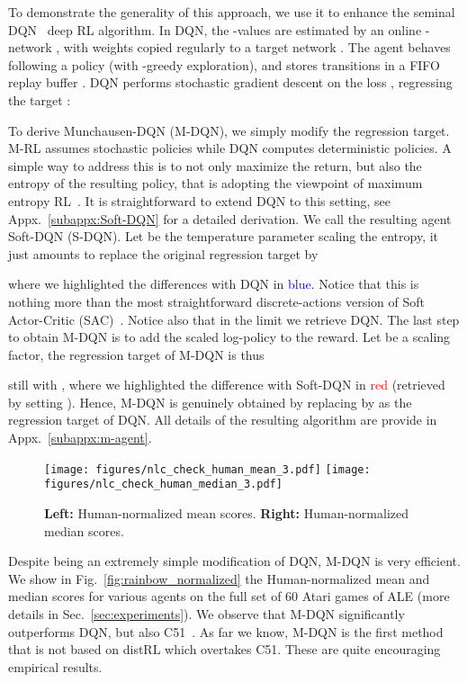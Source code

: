 \documentclass{article}
\begin{document}
To demonstrate the generality of this approach, we use it to enhance the seminal DQN~\cite{mnih2015human} deep RL algorithm. In DQN, the -values are estimated by an online -network , with weights copied regularly to a target network . The agent behaves following a policy  (with -greedy exploration), and stores transitions  in a FIFO replay buffer . DQN performs stochastic gradient descent on the loss , regressing the target :

To derive Munchausen-DQN (M-DQN), we simply modify the regression target. M-RL assumes stochastic policies while DQN computes  deterministic policies. A simple way to address this is to not only maximize the return, but also the entropy of the resulting policy, that is adopting the viewpoint of maximum entropy RL~\cite{ziebart2010modeling,haarnoja2018soft}. It is straightforward to extend DQN to this setting, see Appx.~\ref{subappx:Soft-DQN} for a detailed derivation. We call the resulting agent Soft-DQN (S-DQN). Let  be the temperature parameter scaling the entropy, it just amounts to replace the original regression target by

where we highlighted the differences with DQN in \textcolor{blue}{blue}. Notice that this is nothing more than the most straightforward discrete-actions version of Soft Actor-Critic (SAC)~\cite{haarnoja2018soft}. Notice also that in the limit  we retrieve DQN. The last step to obtain M-DQN is to add the scaled log-policy to the reward.
Let  be a scaling factor, the regression target of M-DQN is thus

still with ,
where we highlighted the difference with Soft-DQN in \textcolor{red}{red} (retrieved by setting ). Hence, M-DQN is genuinely obtained by replacing  by 
 as the regression target of DQN. All details of the resulting algorithm are provide in Appx.~\ref{subappx:m-agent}.

\begin{figure}[thb]
    \centering
    \texttt{[image: figures/nlc\_check\_human\_mean\_3.pdf]}
    \texttt{[image: figures/nlc\_check\_human\_median\_3.pdf]}
    \caption{\textbf{Left:} Human-normalized mean scores. \textbf{Right:} Human-normalized median scores.
    }
    \label{fig:human_normalized}
\end{figure}

Despite being an extremely simple modification of DQN, M-DQN is very efficient. We show in Fig.~\ref{fig:rainbow_normalized} the Human-normalized mean and median scores for various agents on the full set of 60 Atari games of ALE (more details in Sec.~\ref{sec:experiments}). We observe that M-DQN significantly outperforms DQN, but also C51~\cite{bellemare2017distributional}. As far we know, M-DQN is the first method that is not based on distRL which overtakes C51. These are quite encouraging empirical results.
\end{document}
